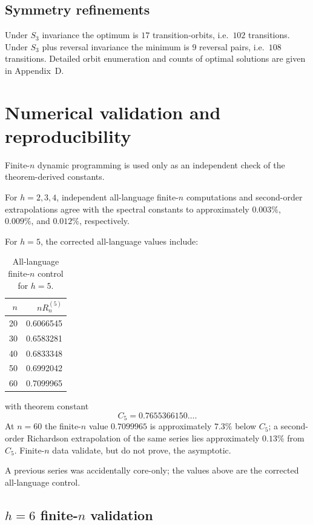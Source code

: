 \documentclass[12pt]{article}
\theoremstyle{definition}
\begin{document}
\subsection*{Symmetry refinements}

Under \(S_3\) invariance the optimum is \(17\) transition-orbits, i.e.\ \(102\) transitions. Under \(S_3\) plus reversal invariance the minimum is \(9\) reversal pairs, i.e.\ \(108\) transitions. Detailed orbit enumeration and counts of optimal solutions are given in Appendix~D.

\section{Numerical validation and reproducibility}
\label{sec:numerics}

Finite-\(n\) dynamic programming is used only as an independent check of the theorem-derived constants.

For \(h=2,3,4\), independent all-language finite-\(n\) computations and second-order extrapolations agree with the spectral constants to approximately \(0.003\%\), \(0.009\%\), and \(0.012\%\), respectively.

For \(h=5\), the corrected all-language values include:

\begin{table}[h]
\centering
\begin{tabular}{rr}
\toprule
\(n\) & \(nR_n^{(5)}\) \\
\midrule
20 & 0.6066545 \\
30 & 0.6583281 \\
40 & 0.6833348 \\
50 & 0.6992042 \\
60 & 0.7099965 \\
\bottomrule
\end{tabular}
\caption{All-language finite-\(n\) control for \(h=5\).}
\label{tab:h5}
\end{table}

\noindent with theorem constant
\[
C_5=0.7655366150\ldots.
\]
At \(n=60\) the finite-\(n\) value \(0.7099965\) is approximately \(7.3\%\) below \(C_5\); a second-order Richardson extrapolation of the same series lies approximately \(0.13\%\) from \(C_5\). Finite-\(n\) data validate, but do not prove, the asymptotic.

A previous series was accidentally core-only; the values above are the corrected all-language control.

\subsection*{\texorpdfstring{\(h=6\)}{h=6} finite-\texorpdfstring{\(n\)}{n} validation}
\end{document}
